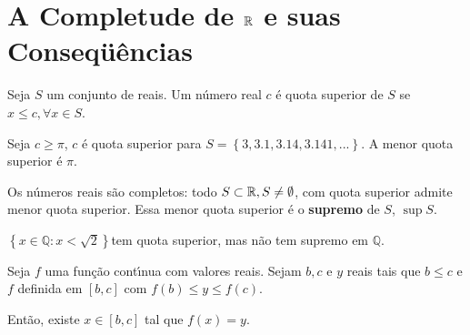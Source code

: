 \documentclass{book}
\begin{document}
\section{A Completude de $\mathbb{R}$ e suas Conseq\"{u}\^{e}ncias} \label{sec04}


\begin{defn}
Seja $S$ um conjunto de reais. Um n\'{u}mero real $c$ \'{e} quota superior
de $S$ se $x \leqslant c,\forall x \in S$.

\end{defn}

\begin{ex}

Seja $c \geqslant \pi $, $c$ \'{e} quota superior para $S = \left\{
{3,3.1,3.14,3.141,...} \right\}$. A menor quota superior \'{e} $\pi $.

\end{ex}

Os n\'{u}meros reais s\~ao completos: todo $S \subset \mathbb{R},S \ne
\emptyset $, com quota superior admite menor quota superior. Essa menor
quota superior \'{e} o \textbf{supremo} de $S$, $\sup S$.

\begin{ex}

$\left\{ {x \in \mathbb{Q}:x < \sqrt 2 } \right\}$tem quota superior, mas
n\~ao tem supremo em $\mathbb{Q}$.

\end{ex}

\begin{teo}
\label{tvi}

Seja $f$ uma fun\c c\~ao cont\'{\i}nua com valores reais. Sejam $b,c$ e
$y$ reais tais que $b \leqslant c$ e $f$ definida em $\left[ {b,c} \right]$
com $f\left( b \right) \leqslant y \leqslant f\left( c \right)$.

Ent\~ao, existe $x \in \left[ {b,c} \right]$ tal que $f\left( x \right) =
y$.

\end{teo}

% 

\end{document}
